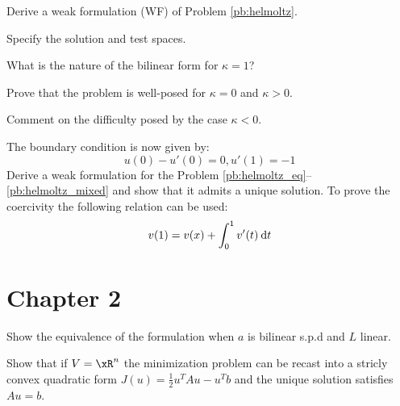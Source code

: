 \begin{tmasltn}{1.4}
\begin{tmatsks}
\item Derive a weak formulation (WF) of Problem \eqref{pb:helmoltz}.
\item Specify the solution and test spaces.
\item What is the nature of the bilinear form for $\kappa = 1$?
\item Prove that the problem is well-posed for $\kappa = 0$ and $\kappa > 0$.
\item Comment on the difficulty posed by the case $\kappa < 0$.
\item The boundary condition is now given by:
\begin{equation}
 u(0) - u'(0) = 0, u'(1) = -1
\end{equation}
Derive a weak formulation for the Problem \eqref{pb:helmoltz_eq}--\eqref{pb:helmoltz_mixed} and show that it admits a unique solution.
To prove the coercivity the following relation can be used:
\[
v(1) = v(x) + \int_0^1 v'(t) \hspace{.5ex}{\mathrm d} t
\]
\end{tmatsks}
\end{tmasltn}

\section{Chapter 2}

\begin{tmasltn}{2.1}
\begin{tmatsks}
\item Show the equivalence of the formulation when $a$ is bilinear s.p.d and $L$ linear.
\item Show that if $\xV = \xR^n$ the minimization problem can be recast into a stricly convex quadratic form $J(u) = \frac{1}{2} u^T A u - u^T b$ and the unique solution satisfies $A u = b$.
\end{tmatsks}
\end{tmasltn}

